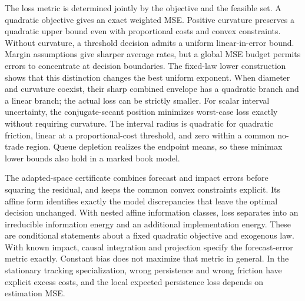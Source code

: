 \documentclass[11pt]{article}
\theoremstyle{plain}
\theoremstyle{definition}
\theoremstyle{remark}
\begin{document}
The loss metric is determined jointly by the objective and the feasible
set. A quadratic objective gives an exact weighted MSE. Positive
curvature preserves a quadratic upper bound even with proportional
costs and convex constraints. Without curvature, a threshold decision
admits a uniform linear-in-error bound. Margin assumptions give sharper
average rates, but a global MSE budget permits errors to concentrate at
decision boundaries. The fixed-law lower construction shows that this
distinction changes the best uniform exponent. When diameter and
curvature coexist, their sharp combined envelope has a quadratic branch
and a linear branch; the actual loss can be strictly smaller.
For scalar interval uncertainty, the conjugate-secant position
minimizes worst-case loss exactly without requiring curvature.
The interval radius is quadratic for quadratic friction, linear
at a proportional-cost threshold, and zero within a common
no-trade region. Queue depletion realizes the endpoint means,
so these minimax lower bounds also hold in a marked book model.

The adapted-space certificate combines forecast and impact errors
before squaring the residual, and keeps the common convex constraints
explicit. Its affine form identifies exactly the model discrepancies
that leave the optimal decision unchanged. With nested affine
information classes, loss separates into an irreducible information
energy and an additional implementation energy. These are conditional
statements about a fixed quadratic objective and exogenous law.
With known impact, causal integration and projection specify the
forecast-error metric exactly. Constant bias does not maximize that
metric in general. In the stationary tracking specialization, wrong
persistence and wrong friction have explicit excess costs, and the
local expected persistence loss depends on estimation MSE.
\end{document}
